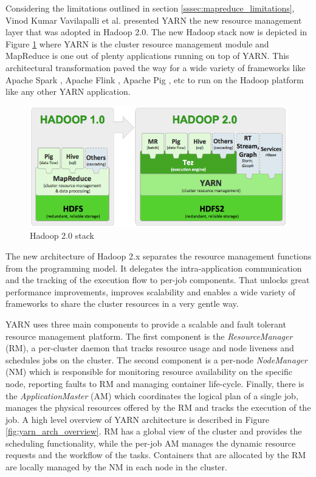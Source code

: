 Considering the limitations outlined in section
\ref{sssec:mapreduce_limitations}, Vinod Kumar Vavilapalli et
al. presented YARN \cite{Vavilapalli:2013:AHY:2523616.2523633} the new
resource management layer that was adopted in Hadoop 2.0. The new
Hadoop stack now is depicted in Figure \ref{fig:yarn_hadoop1_hadoop2_arch} where YARN is the
cluster resource management module and MapReduce is one out of plenty
applications running on top of YARN. This architectural transformation
paved the way for a wide variety of frameworks like
Apache Spark \cite{apache_spark}, Apache Flink \cite{apache_flink},
Apache Pig \cite{apache_pig}, etc to run on the
Hadoop platform like any other YARN application.

\begin{figure}
\centering
\includegraphics[scale=0.6]{resources/images/Background/hadoop1_hadoop2_arch.png}
\caption{Hadoop 2.0 stack \cite{hortonworks_hadoop_stack}}
\label{fig:yarn_hadoop1_hadoop2_arch}
\end{figure}

The new architecture of Hadoop 2.x separates the resource management
functions from the programming model. It delegates the
intra-application communication and the tracking of the execution flow
to per-job components. That unlocks great performance improvements,
improves scalability and enables a wide variety of frameworks to share
the cluster resources in a very gentle way.

YARN uses three main components to provide a scalable and fault
tolerant resource management platform. The first component is the
\emph{ResourceManager} (RM), a per-cluster daemon that tracks resource
usage and node liveness and schedules jobs on the cluster. The second
component is a per-node \emph{NodeManager} (NM) which is responsible
for monitoring resource availability on the specific node, reporting
faults to RM and managing container life-cycle. Finally, there is the
\emph{ApplicationMaster} (AM) which coordinates the logical plan of a
single job, manages the physical resources offered by the RM and
tracks the execution of the job. A high level overview of YARN
architecture is described in Figure \ref{fig:yarn_arch_overview}. RM
has a global view of the cluster and provides the scheduling
functionality, while the per-job AM manages the dynamic resource
requests and the workflow of the tasks. Containers that are allocated
by the RM are locally managed by the NM in each node in the cluster.

